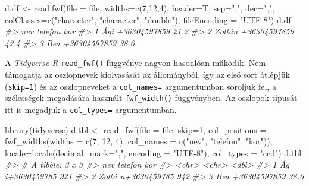 \documentclass[
]{book}
\newenvironment{Shaded}{\begin{snugshade}}{\end{snugshade}}
\newcommand{\AttributeTok}[1]{\textcolor[rgb]{0.77,0.63,0.00}{#1}}
\newcommand{\CommentTok}[1]{\textcolor[rgb]{0.56,0.35,0.01}{\textit{#1}}}
\newcommand{\DecValTok}[1]{\textcolor[rgb]{0.00,0.00,0.81}{#1}}
\newcommand{\FunctionTok}[1]{\textcolor[rgb]{0.00,0.00,0.00}{#1}}
\newcommand{\NormalTok}[1]{#1}
\newcommand{\OtherTok}[1]{\textcolor[rgb]{0.56,0.35,0.01}{#1}}
\newcommand{\StringTok}[1]{\textcolor[rgb]{0.31,0.60,0.02}{#1}}
\begin{document}
\begin{Shaded}
\begin{Highlighting}[]
\NormalTok{d.df }\OtherTok{\textless{}{-}} \FunctionTok{read.fwf}\NormalTok{(}\AttributeTok{file =}\NormalTok{ file, }\AttributeTok{widths=}\FunctionTok{c}\NormalTok{(}\DecValTok{7}\NormalTok{,}\DecValTok{12}\NormalTok{,}\DecValTok{4}\NormalTok{), }\AttributeTok{header=}\NormalTok{T, }\AttributeTok{sep=}\StringTok{";"}\NormalTok{, }\AttributeTok{dec=}\StringTok{","}\NormalTok{, }
                 \AttributeTok{colClasses=}\FunctionTok{c}\NormalTok{(}\StringTok{"character"}\NormalTok{, }\StringTok{"character"}\NormalTok{, }\StringTok{"double"}\NormalTok{), }
                 \AttributeTok{fileEncoding =} \StringTok{"UTF{-}8"}\NormalTok{)}
\NormalTok{d.df}
\CommentTok{\#\textgreater{}       nev      telefon  kor}
\CommentTok{\#\textgreater{} 1     Ági +36304597859 21.2}
\CommentTok{\#\textgreater{} 2  Zoltán +36304597859 42.4}
\CommentTok{\#\textgreater{} 3     Bea +36304597859 38.6}
\end{Highlighting}
\end{Shaded}

A \emph{Tidyverse R} \texttt{read\_fwf()} függvénye nagyon hasonlóan működik. Nem támogatja az oszlopnevek kiolvasását az állományból, így az első sort átlépjük (\texttt{skip=1}) és az oszlopneveket a \texttt{col\_names=} argumentumban soroljuk fel, a szélességek megadására használt \texttt{fwf\_width()} függvényben. Az oszlopok típusát itt is megadjuk a \texttt{col\_types=} argumentumban.

\begin{Shaded}
\begin{Highlighting}[]
\FunctionTok{library}\NormalTok{(tidyverse)}
\NormalTok{d.tbl }\OtherTok{\textless{}{-}} \FunctionTok{read\_fwf}\NormalTok{(}\AttributeTok{file =}\NormalTok{ file, }\AttributeTok{skip=}\DecValTok{1}\NormalTok{, }
                  \AttributeTok{col\_positions =} \FunctionTok{fwf\_widths}\NormalTok{(}\AttributeTok{widths =} \FunctionTok{c}\NormalTok{(}\DecValTok{7}\NormalTok{, }\DecValTok{12}\NormalTok{, }\DecValTok{4}\NormalTok{), }
                                             \AttributeTok{col\_names =} 
                                               \FunctionTok{c}\NormalTok{(}\StringTok{"nev"}\NormalTok{, }\StringTok{"telefon"}\NormalTok{, }\StringTok{"kor"}\NormalTok{)), }
                  \AttributeTok{locale=}\FunctionTok{locale}\NormalTok{(}\AttributeTok{decimal\_mark=}\StringTok{","}\NormalTok{, }\AttributeTok{encoding =} \StringTok{"UTF{-}8"}\NormalTok{), }
                  \AttributeTok{col\_types =} \StringTok{"ccd"}\NormalTok{)}
\NormalTok{d.tbl}
\CommentTok{\#\textgreater{} \# A tibble: 3 x 3}
\CommentTok{\#\textgreater{}   nev   telefon        kor}
\CommentTok{\#\textgreater{}   \textless{}chr\textgreater{} \textless{}chr\textgreater{}        \textless{}dbl\textgreater{}}
\CommentTok{\#\textgreater{} 1 Ág    i+3630459785 921  }
\CommentTok{\#\textgreater{} 2 Zoltá n+3630459785 942  }
\CommentTok{\#\textgreater{} 3 Bea   +36304597859  38.6}
\end{Highlighting}
\end{Shaded}
\end{document}

